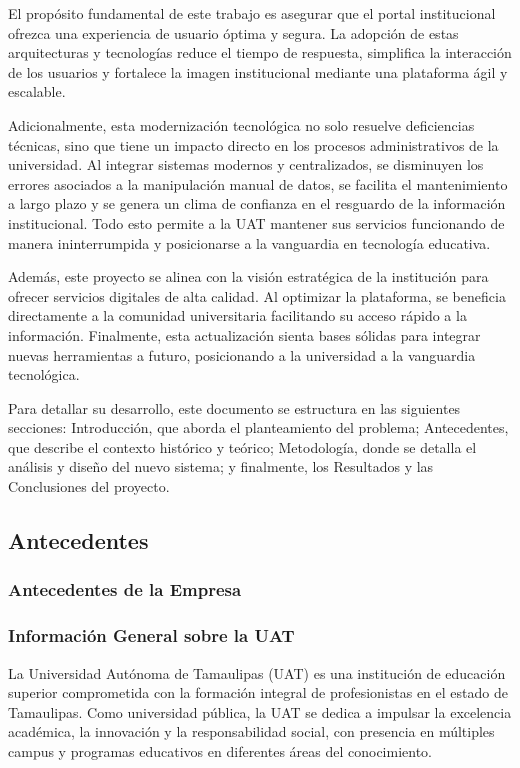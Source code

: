El propósito fundamental de este trabajo es asegurar que el portal institucional ofrezca una experiencia de usuario óptima y segura. La adopción de estas arquitecturas y tecnologías reduce el tiempo de respuesta, simplifica la interacción de los usuarios y fortalece la imagen institucional mediante una plataforma ágil y escalable. 

Adicionalmente, esta modernización tecnológica no solo resuelve deficiencias técnicas, sino que tiene un impacto directo en los procesos administrativos de la universidad. Al integrar sistemas modernos y centralizados, se disminuyen los errores asociados a la manipulación manual de datos, se facilita el mantenimiento a largo plazo y se genera un clima de confianza en el resguardo de la información institucional. Todo esto permite a la UAT mantener sus servicios funcionando de manera ininterrumpida y posicionarse a la vanguardia en tecnología educativa.

Además, este proyecto se alinea con la visión estratégica de la institución para ofrecer servicios digitales de alta calidad. Al optimizar la plataforma, se beneficia directamente a la comunidad universitaria facilitando su acceso rápido a la información. Finalmente, esta actualización sienta bases sólidas para integrar nuevas herramientas a futuro, posicionando a la universidad a la vanguardia tecnológica.

Para detallar su desarrollo, este documento se estructura en las siguientes secciones: Introducción, que aborda el planteamiento del problema; Antecedentes, que describe el contexto histórico y teórico; Metodología, donde se detalla el análisis y diseño del nuevo sistema; y finalmente, los Resultados y las Conclusiones del proyecto.

\subsection{Antecedentes}
\label{sec:antecedentes}

\subsubsection{Antecedentes de la Empresa}
\label{subsec:antecedentes_empresa}

\subsubsection*{Información General sobre la UAT}

La Universidad Autónoma de Tamaulipas (UAT) es una institución de educación superior comprometida con la formación integral de profesionistas en el estado de Tamaulipas. Como universidad pública, la UAT se dedica a impulsar la excelencia académica, la innovación y la responsabilidad social, con presencia en múltiples campus y programas educativos en diferentes áreas del conocimiento.

